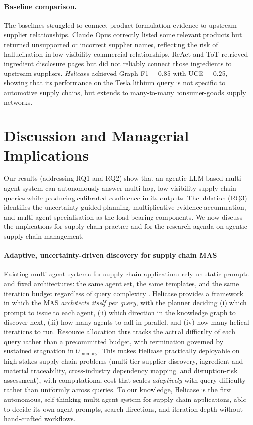 \documentclass{article}
\begin{document}
\paragraph{Baseline comparison.}
The baselines struggled to connect product formulation evidence to upstream supplier relationships. Claude Opus correctly listed some relevant products but returned unsupported or incorrect supplier names, reflecting the risk of hallucination in low-visibility commercial relationships. ReAct and ToT retrieved ingredient disclosure pages but did not reliably connect those ingredients to upstream suppliers. \textit{Helicase} achieved Graph F1 = 0.85 with UCE = 0.25, showing that its performance on the Tesla lithium query is not specific to automotive supply chains, but extends to many-to-many consumer-goods supply networks.



\section{Discussion and Managerial Implications}
\label{sec:discussion}

Our results (addressing RQ1 and RQ2) show that an agentic LLM-based multi-agent system can autonomously answer multi-hop, low-visibility supply chain queries while producing calibrated confidence in its outputs. The ablation (RQ3) identifies the uncertainty-guided planning, multiplicative evidence accumulation, and multi-agent specialisation as the load-bearing components. We now discuss the implications for supply chain practice and for the research agenda on agentic supply chain management.

\paragraph{Adaptive, uncertainty-driven discovery for supply chain MAS}
Existing multi-agent systems for supply chain applications rely on static prompts and fixed architectures: the same agent set, the same templates, and the same iteration budget regardless of query complexity \citep{xu2021bots}. Helicase provides a framework in which the MAS \emph{architects itself per query}, with the planner deciding (i) which prompt to issue to each agent, (ii) which direction in the knowledge graph to discover next, (iii) how many agents to call in parallel, and (iv) how many helical iterations to run. Resource allocation thus tracks the actual difficulty of each query rather than a precommitted budget, with termination governed by sustained stagnation in $U_{\text{memory}}$. This makes Helicase practically deployable on high-stakes supply chain problems (multi-tier supplier discovery, ingredient and material traceability, cross-industry dependency mapping, and disruption-risk assessment), with computational cost that scales \emph{adaptively} with query difficulty rather than uniformly across queries. To our knowledge, Helicase is the first autonomous, self-thinking multi-agent system for supply chain applications, able to decide its own agent prompts, search directions, and iteration depth without hand-crafted workflows.
\end{document}
